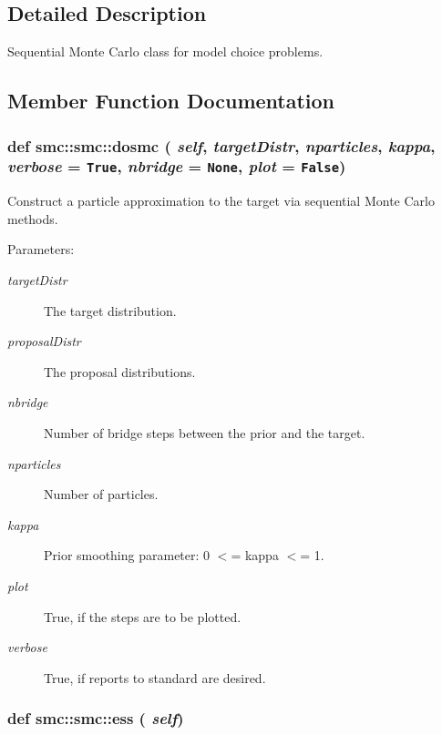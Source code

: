 \subsection{Detailed Description}
Sequential Monte Carlo class for model choice problems. 

\subsection{Member Function Documentation}
\hypertarget{classsmc_1_1smc_32f2ee107cd254620e678aac22a45d21}{
\subsubsection[{dosmc}]{\setlength{\rightskip}{0pt plus 5cm}def smc::smc::dosmc ( {\em self}, \/   {\em targetDistr}, \/   {\em nparticles}, \/   {\em kappa}, \/   {\em verbose} = {\tt True}, \/   {\em nbridge} = {\tt None}, \/   {\em plot} = {\tt False})}}
\label{classsmc_1_1smc_32f2ee107cd254620e678aac22a45d21}


Construct a particle approximation to the target via sequential Monte Carlo methods. 

\begin{Desc}
\item[Parameters:]
\begin{description}
\item[{\em targetDistr}]The target distribution. \item[{\em proposalDistr}]The proposal distributions. \item[{\em nbridge}]Number of bridge steps between the prior and the target. \item[{\em nparticles}]Number of particles. \item[{\em kappa}]Prior smoothing parameter: 0 $<$= kappa $<$= 1. \item[{\em plot}]True, if the steps are to be plotted. \item[{\em verbose}]True, if reports to standard are desired. \end{description}
\end{Desc}
\hypertarget{classsmc_1_1smc_95aec6accabbea27d33eb8a5a4eb7ed2}{
\subsubsection[{ess}]{\setlength{\rightskip}{0pt plus 5cm}def smc::smc::ess ( {\em self})}}
\label{classsmc_1_1smc_95aec6accabbea27d33eb8a5a4eb7ed2}


